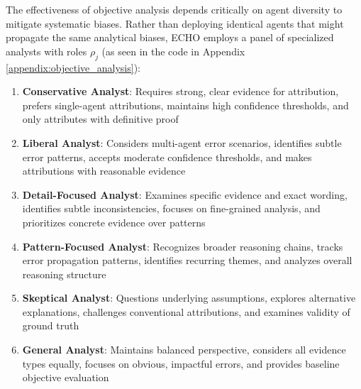 \documentclass{article}
\begin{document}
The effectiveness of objective analysis depends critically on agent diversity to mitigate systematic biases. Rather than deploying identical agents that might propagate the same analytical biases, ECHO employs a panel of specialized analysts with roles $\rho_j$ (as seen in the code in Appendix \ref{appendix:objective_analysis}):
\begin{enumerate}
    \item \textbf{Conservative Analyst}: Requires strong, clear evidence for attribution, prefers single-agent attributions, maintains high confidence thresholds, and only attributes with definitive proof
    \item \textbf{Liberal Analyst}: Considers multi-agent error scenarios, identifies subtle error patterns, accepts moderate confidence thresholds, and makes attributions with reasonable evidence
    \item \textbf{Detail-Focused Analyst}: Examines specific evidence and exact wording, identifies subtle inconsistencies, focuses on fine-grained analysis, and prioritizes concrete evidence over patterns
    \item \textbf{Pattern-Focused Analyst}: Recognizes broader reasoning chains, tracks error propagation patterns, identifies recurring themes, and analyzes overall reasoning structure
    \item \textbf{Skeptical Analyst}: Questions underlying assumptions, explores alternative explanations, challenges conventional attributions, and examines validity of ground truth
    \item \textbf{General Analyst}: Maintains balanced perspective, considers all evidence types equally, focuses on obvious, impactful errors, and provides baseline objective evaluation
\end{enumerate}
\end{document}
